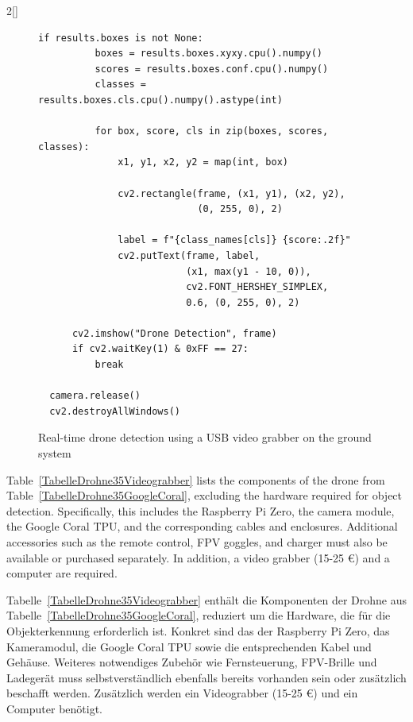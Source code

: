 \begin{paracol}{2}[]
\begin{figure}
\begin{lstlisting}[style=shell]
      if results.boxes is not None:
          boxes = results.boxes.xyxy.cpu().numpy()
          scores = results.boxes.conf.cpu().numpy()
          classes = results.boxes.cls.cpu().numpy().astype(int)

          for box, score, cls in zip(boxes, scores, classes):
              x1, y1, x2, y2 = map(int, box)

              cv2.rectangle(frame, (x1, y1), (x2, y2),
                            (0, 255, 0), 2)

              label = f"{class_names[cls]} {score:.2f}"
              cv2.putText(frame, label,
                          (x1, max(y1 - 10, 0)),
                          cv2.FONT_HERSHEY_SIMPLEX,
                          0.6, (0, 255, 0), 2)

      cv2.imshow("Drone Detection", frame)
      if cv2.waitKey(1) & 0xFF == 27:
          break

  camera.release()
  cv2.destroyAllWindows()
\end{lstlisting}
\caption{Real-time drone detection using a USB video grabber on the ground system}
\label{DroneDetectionUSBVideoGrab}
\end{figure}
\FloatBarrier

\renewcommand{\deutschertitel}{Gesamtgewicht und Anschaffungskosten}
\renewcommand{\englischertitel}{Total Weight and Purchase Cost}
\makrounterabschnitt
\label{AbschnittObjekterkennungKostenVideoGrabber}

Table~\ref{TabelleDrohne35Videograbber} lists the components of the drone from Table~\ref{TabelleDrohne35GoogleCoral}, excluding the hardware required for object detection. Specifically, this includes the Raspberry Pi Zero, the camera module, the Google Coral TPU, and the corresponding cables and enclosures. Additional accessories such as the remote control, FPV goggles, and charger must also be available or purchased separately. In addition, a video grabber (15-25 \euro{}) and a computer are required.

\colger

Tabelle~\ref{TabelleDrohne35Videograbber} enthält die Komponenten der Drohne aus Tabelle~\ref{TabelleDrohne35GoogleCoral}, reduziert um die Hardware, die für die Objekterkennung erforderlich ist. Konkret sind das der Raspberry Pi Zero, das Kameramodul, die Google Coral TPU sowie die entsprechenden Kabel und Gehäuse. Weiteres notwendiges Zubehör wie Fernsteuerung, FPV-Brille und Ladegerät muss selbstverständlich ebenfalls bereits vorhanden sein oder zusätzlich beschafft werden. Zusätzlich werden ein Videograbber (15-25 \euro{}) und ein Computer benötigt.


\end{paracol}
